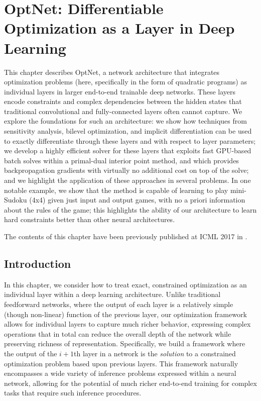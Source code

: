\chapter{OptNet: Differentiable Optimization
  as a Layer in Deep Learning}
\label{sec:optnet}

\graphicspath{{optnet/images/}}

This chapter describes OptNet, a network architecture that integrates
optimization problems (here, specifically in the form of quadratic programs)
as individual layers in larger end-to-end trainable deep networks.
These layers encode constraints and complex dependencies
between the hidden states that traditional convolutional and
fully-connected layers often cannot capture.
We explore the foundations for such an architecture:
we show how techniques from sensitivity analysis, bilevel
optimization, and implicit differentiation can be used to
exactly differentiate through these layers and with respect
to layer parameters;
we develop a highly efficient solver for these layers that exploits fast
GPU-based batch solves within a primal-dual interior point method, and which
provides backpropagation gradients with virtually no additional cost on top of
the solve;
and we highlight the application of these approaches in several problems.
In one notable example, we show that the method is
capable of learning to play mini-Sudoku (4x4) given just input and output games,
with no a priori information about the rules of the game;
this highlights the ability of our architecture to learn hard
constraints better than other neural architectures.

The contents of this chapter have been previously published
at ICML 2017 in \citet{amos2017optnet}.

\section{Introduction}

In this chapter, we consider how to treat exact, constrained optimization as
an individual layer within a deep learning architecture.
Unlike traditional feedforward networks, where the output of each
layer is a relatively simple (though non-linear) function of the previous layer,
our optimization framework allows for individual layers to capture much richer
behavior, expressing complex operations that in total can reduce the overall
depth of the network while preserving richness of representation.  Specifically,
we build a framework where the output of the $i+1$th layer in a network is the
\emph{solution} to a constrained optimization problem based upon previous
layers.  This framework naturally encompasses a wide variety of inference
problems expressed within a neural network, allowing for the potential of much
richer end-to-end training for complex tasks that require such inference
procedures.


